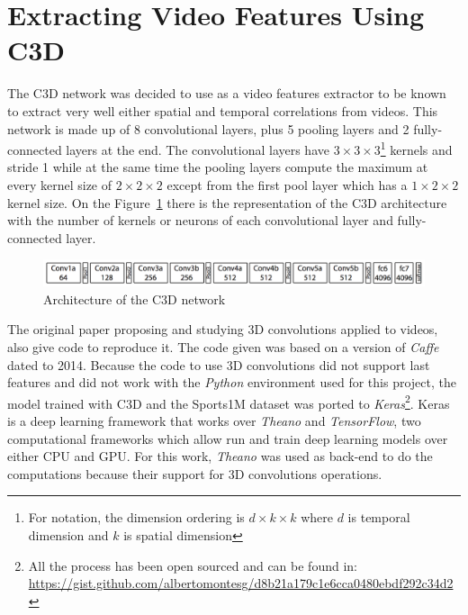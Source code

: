 \section{Extracting Video Features Using C3D}

The C3D network\cite{tran2014learning} was decided to use as a video features extractor to be known to extract very well\cite{baccouche2011sequential}\cite{tran2015deep}\cite{tran2014learning}\cite{shoutemporal} either spatial and temporal correlations from videos. This network is made up of 8 convolutional layers, plus 5 pooling layers and 2 fully-connected layers at the end. The convolutional layers have $3 \times 3 \times 3$\footnote{For notation, the dimension ordering is $d \times k \times k$ where $d$ is temporal dimension and $k$ is spatial dimension} kernels and stride 1 while at the same time the pooling layers compute the maximum at every kernel size of $2 \times 2 \times 2$ except from the first pool layer which has a $1 \times 2 \times 2$ kernel size. On the Figure~\ref{fig:c3d_architecture} there is the representation of the C3D architecture with the number of kernels or neurons of each convolutional layer and fully-connected layer.

\begin{figure}[H]
\begin{center}
\includegraphics[width=1\linewidth]{img/methodology/c3d_architecture}
\end{center}
\caption{Architecture of the C3D network}
\label{fig:c3d_architecture}
\end{figure}

The original paper proposing and studying 3D convolutions applied to videos, also give code to reproduce it. The code given was based on a version of \textit{Caffe}\cite{jia2014caffe} dated to 2014. Because the code to use 3D convolutions did not support last features and did not work with the \textit{Python} environment used for this project, the model trained with C3D and the Sports1M\cite{KarpathyCVPR14} dataset was ported to \textit{Keras}\footnote{All the process has been open sourced and can be found in: \url{https://gist.github.com/albertomontesg/d8b21a179c1e6cca0480ebdf292c34d2}}. Keras is a deep learning framework that works over \textit{Theano}\cite{theano2016theano} and \textit{TensorFlow}\cite{abadi2016tensorflow}, two computational frameworks which allow run and train deep learning models over either CPU and GPU. For this work, \textit{Theano} was used as back-end to do the computations because their support for 3D convolutions operations.

